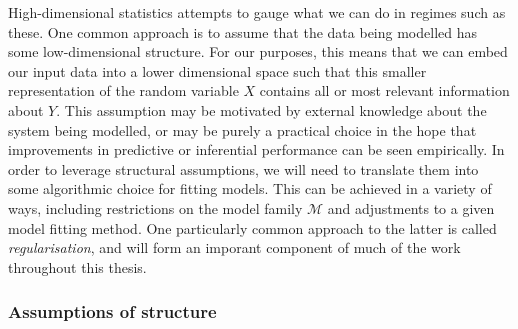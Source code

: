 \documentclass[thesis.tex]{subfiles}
\begin{document}
High-dimensional statistics attempts to gauge what we can do in regimes such as these. One common approach is to assume that the data being modelled has some low-dimensional structure. For our purposes, this means that we can embed our input data into a lower dimensional space such that this smaller representation of the random variable $X$ contains all or most relevant information about $Y$. This assumption may be motivated by external knowledge about the system being modelled, or may be purely a practical choice in the hope that improvements in predictive or inferential performance can be seen empirically. In order to leverage structural assumptions, we will need to translate them into some algorithmic choice for fitting models. This can be achieved in a variety of ways, including restrictions on the model family $\mathcal{M}$ and adjustments to a given model fitting method. One particularly common approach to the latter is called \emph{regularisation}, and will form an imporant component of much of the work throughout this thesis.

\subsubsection{Assumptions of structure}
\end{document}
